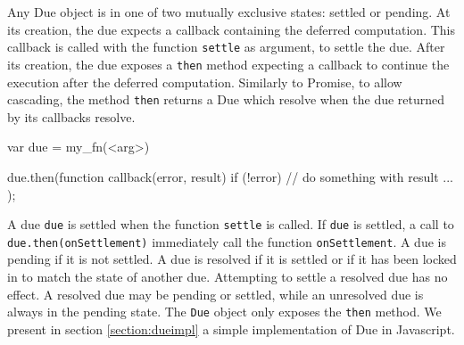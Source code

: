 Any Due object is in one of two mutually exclusive states: settled or pending.
At its creation, the due expects a callback containing the deferred computation.
This callback is called with the function \texttt{settle} as argument, to settle the due.
After its creation, the due exposes a \texttt{then} method expecting a callback to continue the execution after the deferred computation.
Similarly to Promise, to allow cascading, the method \texttt{then} returns a Due which resolve when the due returned by its callbacks resolve.

\begin{code}[js, %
             caption={Example of a due}, %
             label={lst:then}] %
var due = my_fn(<arg>)

due.then(function callback(error, result) {
  if (!error) {
    // do something with result ...
  }
});
\end{code}

A due \texttt{due} is settled when the function \texttt{settle} is called.
If \texttt{due} is settled, a call to \texttt{due.then(onSettlement)} immediately call the function \texttt{onSettlement}.
A due is pending if it is not settled.
A due is resolved if it is settled or if it has been locked in to match the state of another due.
Attempting to settle a resolved due has no effect.
A resolved due may be pending or settled, while an unresolved due is always in the pending state.
The \texttt{Due} object only exposes the \texttt{then} method.
We present in section \ref{section:dueimpl} a simple implementation of Due in Javascript.
